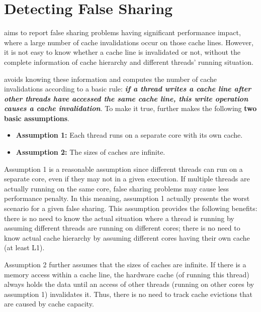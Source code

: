 \section{Detecting False Sharing}
\label{sec:detect}

\cheetah{} aims to report false sharing problems having significant performance impact, where a large number of cache invalidations occur on those cache lines. However, it is not easy to know whether a cache line is invalidated or not, without the complete information of cache hierarchy and different threads' running situation. 

\cheetah{} avoids knowing these information and computes the number of cache invalidations according to a basic rule: {\it \bf if a thread writes a cache line after other threads have accessed the same cache line, this write operation causes a cache invalidation}. To make it true, \cheetah{} further makes the following \textbf{two basic assumptions}.

\begin{itemize} 
\item {\bf Assumption 1:} Each thread runs on a separate core with its own cache. 

\item {\bf Assumption 2: } The sizes of caches are infinite. 
 
\end{itemize}

Assumption 1 is a reasonable assumption since different threads can run on a separate core, even if they may not in a given execution. If multiple threads are actually running on the same core, false sharing problems may cause less performance penalty. In this meaning, assumption 1 actually presents the worst scenario for a given false sharing. This assumption provides the following benefits: there is no need to know the actual situation where a thread is running by assuming different threads are running on different cores; there is no need to know actual cache hierarchy by assuming different cores having their own cache (at least L1). 

Assumption 2 further assumes that the sizes of caches are infinite. If there is a memory access within a cache line, the hardware cache (of running this thread) always holds the data until an access of other threads (running on other cores by assumption 1) invalidates it. Thus, there is no need to track cache evictions that are caused by cache capacity. 

